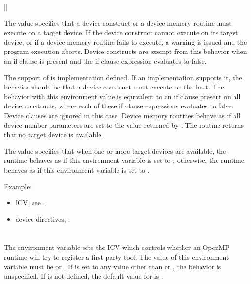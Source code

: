 {||}

The  value specifies that a device construct or a device memory routine must execute on a target device. If the device construct cannot execute on its target device, or if a device memory routine fails to execute, a warning is issued and the program execution aborts. Device constructs are exempt from this behavior when an if-clause is present and the if-clause expression evaluates to false.

The support of  is implementation defined.
If an implementation supports it, the behavior should be that a device
construct must execute on the host.
The behavior with this environment value is equivalent to an if clause present
on all device constructs, where each of these if clause expressions evaluates
to false. Device clauses are ignored in this case.
Device memory routines behave as if all device number parameters are set to the
value returned by .
The  routine returns that no target device is available.

The  value specifies that when one or more target devices are
available, the runtime behaves as if this environment variable is set to
; otherwise, the runtime behaves as if this environment
variable is set to .

Example:
\begin{ompEnv}
\end{ompEnv}

\crossreferences
\begin{itemize}
\item {} ICV, see .
\item device directives, .
\end{itemize}




\section{}
\label{sec:OMP_TOOL}

The  environment variable sets the  ICV which controls whether an OpenMP runtime will try to register a
first party tool.
The value of this environment variable must be  or .
If  is set to any value other than  or , the behavior is unspecified.
If  is not defined, the default value for  is .


